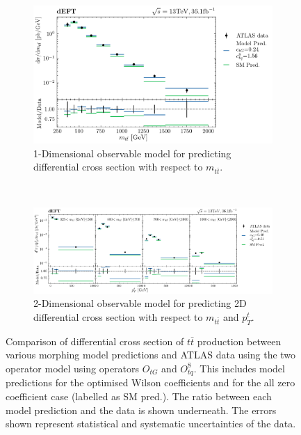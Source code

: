 \documentclass[a4paper,11pt]{article}
\begin{document}
\begin{figure}[H]
    \centering
    \begin{subfigure}[b]{0.8\textwidth}
        \centering
        \includegraphics[width=\textwidth]{plots/ATLAS_model_result_1D_2OP.png}
        \caption{1-Dimensional observable model for predicting differential cross section with respect to $m_{t\bar{t}}$.}
        \label{fig:model_result_1D_2OP}
    \end{subfigure}
    ~
    \begin{subfigure}[b]{\textwidth}
        \centering
        \includegraphics[width=\textwidth]{plots/ATLAS_model_result_2D_2OP.png}
        \caption{2-Dimensional observable model for predicting 2D differential cross section with respect to $m_{t\bar{t}}$ and $p_{T}^{t}$.}
        \label{fig:model_result_2D_2OP}
    \end{subfigure}
    \centering
    \caption{Comparison of differential cross section of $t\bar{t}$ production between various morphing model predictions and ATLAS data using the two operator model using operators $O_{tG}$ and $O_{tq}^{8}$. This includes model predictions for the optimised Wilson coefficients and for the all zero coefficient case (labelled as SM pred.). The ratio between each model prediction and the data is shown underneath. The errors shown represent statistical and systematic uncertainties of the data.}
    \label{fig:model_result_2OP}
\end{figure}
\end{document}
